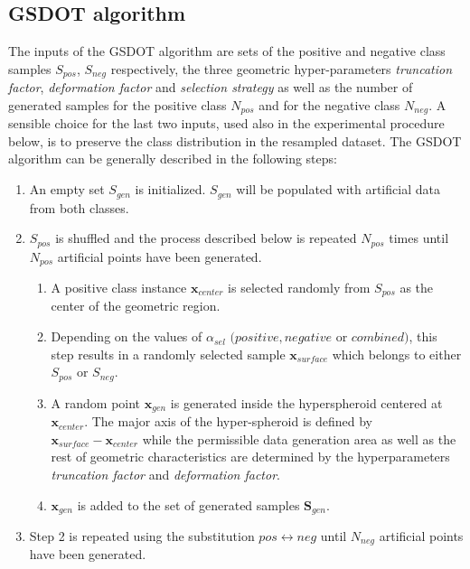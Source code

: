 \documentclass[10pt,letterpaper]{article}
\begin{document}
\subsection{GSDOT algorithm}
\label{algorithm}

The inputs of the GSDOT algorithm are sets of the positive and negative class samples \( S_{pos} \), \( S_{neg} \) respectively, the three geometric hyper-parameters \textit{truncation factor}, \textit{deformation factor} and \textit{selection strategy} as well as the number of generated samples for the positive class \(N_{pos} \) and for the negative class \( N_{neg} \). A sensible choice for the last two inputs, used also in the experimental procedure below, is to preserve the class distribution in the resampled dataset. The GSDOT algorithm can be generally described in the following steps:

\begin{enumerate}

  \renewcommand{\labelenumii}{\theenumii}
  \renewcommand{\theenumii}{\theenumi.\arabic{enumii}.}
  
    \item An empty set \( S_{gen} \) is initialized. \( S_{gen} \) will be populated with artificial data from both classes.
  
    \item \( S_{pos} \) is shuffled and the process described below is repeated \( N_{pos} \) times until \( N_{pos} \) artificial points have been generated.
  
    \begin{enumerate}
  
      \item A positive class instance \( \textbf{x}_{center} \) is selected randomly from \( S_{pos} \) as the center of the geometric region.
  
      \item Depending on the values of \( \alpha_{sel} \) \( (positive, negative \) or \( combined) \), this step results in a randomly selected sample \(\textbf{x}_{surface} \) which belongs to either \( S_{pos} \) or \( S_{neg} \).
  
      \item A random point \(\textbf{x}_{gen} \) is generated inside the hyperspheroid centered at \( \textbf{x}_{center} \). The major axis of the hyper-spheroid is defined by \( \textbf{x}_{surface} - \textbf{x}_{center} \) while the permissible data generation area as well as the rest of geometric characteristics are determined by the hyperparameters \textit{truncation factor} and \textit{deformation factor}.
  
      \item \( \textbf{x}_{gen} \) is added to the set of generated samples
      \( \textbf{S}_{gen} \).
    
    \end{enumerate}
  
    \item Step 2 is repeated using the substitution \( pos \leftrightarrow neg \) until \( N_{neg} \) artificial points have been generated.
  
  \end{enumerate}
\end{document}
